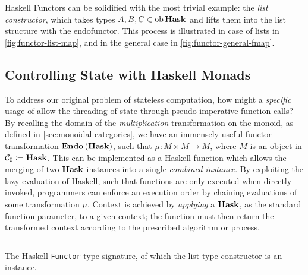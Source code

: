 Haskell Functors can be solidified with the most trivial example: the \emph{list
constructor}, which takes types $A,B,C \in \operatorname{ob} \operatorname{\mathbf{Hask}}$ and lifts them into
the list structure with the  endofunctor\footnotemark. This
process is illustrated in case of lists in \autoref{fig:functor-list-map}, and
in the general case in \autoref{fig:functor-general-fmap}.
%

\subsection{Controlling State with Haskell Monads}

To address our original problem of stateless computation, how might a
\emph{specific} usage of  allow the threading of state through
pseudo-imperative function calls? By recalling the domain of the
\emph{multiplication} transformation on the monoid, as defined in
\autoref{sec:monoidal-categories}, we have an immensely useful functor
transformation $\operatorname{\mathbf{Endo}}{(\operatorname{\mathbf{Hask}})}$, such that $\mu \colon M \times M \to M$,
where $M$ is an object in $\mathcal{C}_0 \coloneqq \operatorname{\mathbf{Hask}}$. This can be
implemented as a Haskell function which allows the merging of two $\operatorname{\mathbf{Hask}}$
instances into a single \emph{combined instance}.
%
By exploiting the lazy evaluation of Haskell, such that functions are only
executed when directly invoked, programmers can enforce an execution order by
chaining evaluations of some transformation $\mu$. Context is achieved by
\emph{applying} a $\operatorname{\mathbf{Hask}}$, as the standard function parameter, to a given
context; the function must then return the transformed context according to the
prescribed algorithm or process.

\begin{listing}
        \inputminted{haskell}{haskell/Functor.hs}%
        \caption{The Haskell \texttt{Functor} type signature, of which the list
                type constructor \inlinehask{[]} is an instance.}
        \label{lst:hask-functor}
\end{listing}
%
%
